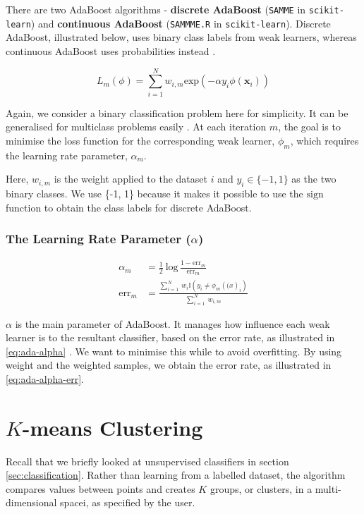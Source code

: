 There are two AdaBoost algorithms - \textbf{discrete AdaBoost} (\texttt{SAMME} in \texttt{scikit-learn}) and \textbf{continuous AdaBoost} (\texttt{SAMMME.R} in \texttt{scikit-learn}). Discrete AdaBoost, illustrated below, uses binary class labels from weak learners, whereas continuous AdaBoost uses probabilities instead \cite{mur-book}.

\begin{equation} \label{eq:ada-optimise}
  L_m(\phi) = \sum_{i=1}^{N} w_{i,m} \mathrm{exp}(-\alpha y_i \phi(\mathbf{x}_i))
\end{equation}

Again, we consider a binary classification problem here for simplicity. It can be generalised for multiclass problems easily \cite{mur-book}. At each iteration $m$, the goal is to minimise the loss function for the corresponding weak learner, $\phi_m$, which requires the learning rate parameter, $\alpha_m$. 

Here, $w_{i,m}$ is the weight applied to the dataset $i$ and $y_i \in \{-1, 1\}$ as the two binary classes. We use \{-1, 1\} because it makes it possible to use the $\mathrm{sign}$ function to obtain the class labels for discrete AdaBoost.

\subsubsection{The Learning Rate Parameter ($\alpha$)} 

\begin{align}
  \alpha_m &= \frac{1}{2} \: \mathrm{log} \, \frac{1-\mathrm{err}_m}{\mathrm{err}_m}
  \label{eq:ada-alpha} \\
  \mathrm{err}_m &= \frac{\sum_{i=1}^N \: w_i \mathbb{I}(y_i \neq \phi_m(\mathbf(x)_i)}{\sum_{i=1}^{N} \: w_{i,m}}
  \label{eq:ada-alpha-err}
\end{align}


$\alpha$ is the main parameter of AdaBoost. It manages how influence each weak learner is to the resultant classifier, based on the error rate, as illustrated in \autoref{eq:ada-alpha} \cite{ada-improved}. We want to minimise this while to avoid overfitting. By using weight and the weighted samples, we obtain the error rate, as illustrated in \autoref{eq:ada-alpha-err}.






\newpage
\section{$K$-means Clustering} \label{sec:tech-kmeans}
Recall that we briefly looked at unsupervised classifiers in section \ref{sec:classification}. Rather than learning from a labelled dataset, the algorithm compares values between points and creates $K$ groups, or clusters, in a multi-dimensional spacei, as specified by the user.

